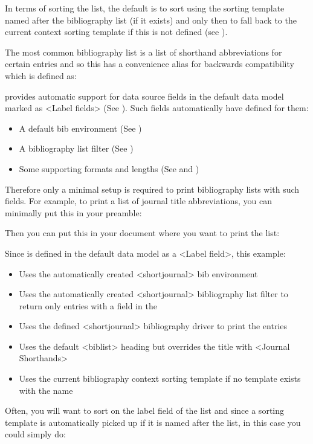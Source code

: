 \documentclass{ltxdockit}[2011/03/25]
\newcommand*{\biblatex}{\sty{biblatex}\xspace}
\begin{document}
\begin{ltxsyntax}
In terms of sorting the list, the default is to sort using the sorting template named after the bibliography list (if it exists) and only then to fall back to the current context sorting template if this is not defined (see ).

The most common bibliography list is a list of shorthand abbreviations for certain entries and so this has a convenience alias  for backwards compatibility which is defined as:

\begin{ltxexample}
\end{ltxexample}

\biblatex provides automatic support for data source fields in the default data model marked as <Label fields> (See ). Such fields automatically have defined for them:

\begin{itemize}
\item A default bib environment (See )
\item A bibliography list filter (See )
\item Some supporting formats and lengths (See  and )
\end{itemize}
%
Therefore only a minimal setup is required to print bibliography lists with such fields. For example, to print a list of journal title abbreviations, you can minimally put this in your preamble:

\begin{ltxexample}
\end{ltxexample}
%
Then you can put this in your document where you want to print the list:

\begin{ltxexample}
\end{ltxexample}
%
Since  is defined in the default data model as a <Label field>, this example:
\begin{itemize}
\item Uses the automatically created <shortjournal> bib environment
\item Uses the automatically created <shortjournal> bibliography list filter to return only entries with a  field in the 
\item Uses the defined <shortjournal> bibliography driver to print the entries
\item Uses the default <biblist> heading but overrides the title with <Journal Shorthands>
\item Uses the current bibliography context sorting template if no template exists with the name 
\end{itemize}
%
Often, you will want to sort on the label field of the list and since a sorting template is automatically picked up if it is named after the list, in this case you could simply do:


\end{ltxsyntax}
\end{document}
